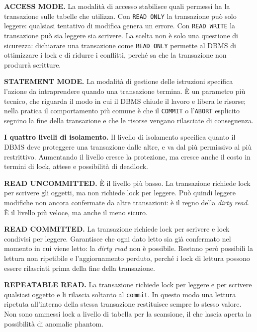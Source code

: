 \documentclass[12pt]{extarticle}
\begin{document}
\medskip
\noindent \textbf{ACCESS MODE.} La modalità di accesso stabilisce quali permessi ha la transazione sulle tabelle che utilizza. Con \texttt{READ ONLY} la transazione può solo leggere: qualsiasi tentativo di modifica genera un errore. Con \texttt{READ WRITE} la transazione può sia leggere sia scrivere. La scelta non è solo una questione di sicurezza: dichiarare una transazione come \texttt{READ ONLY} permette al DBMS di ottimizzare i lock e di ridurre i conflitti, perché sa che la transazione non produrrà scritture.

\medskip
\noindent \textbf{STATEMENT MODE.} La modalità di gestione delle istruzioni specifica l'azione da intraprendere quando una transazione termina. È un parametro più tecnico, che riguarda il modo in cui il DBMS chiude il lavoro e libera le risorse; nella pratica il comportamento più comune è che il \texttt{COMMIT} o l'\texttt{ABORT} esplicito segnino la fine della transazione e che le risorse vengano rilasciate di conseguenza.

\medskip
\noindent \textbf{I quattro livelli di isolamento.} Il livello di isolamento specifica quanto il DBMS deve proteggere una transazione dalle altre, e va dal più permissivo al più restrittivo. Aumentando il livello cresce la protezione, ma cresce anche il costo in termini di lock, attese e possibilità di deadlock.

\medskip
\noindent \textbf{READ UNCOMMITTED.} È il livello più basso. La transazione richiede lock per scrivere gli oggetti, ma non richiede lock per leggere. Può quindi leggere modifiche non ancora confermate da altre transazioni: è il regno della \textit{dirty read}. È il livello più veloce, ma anche il meno sicuro.

\medskip
\noindent \textbf{READ COMMITTED.} La transazione richiede lock per scrivere e lock condivisi per leggere. Garantisce che ogni dato letto sia già confermato nel momento in cui viene letto: la \textit{dirty read} non è possibile. Restano però possibili la lettura non ripetibile e l'aggiornamento perduto, perché i lock di lettura possono essere rilasciati prima della fine della transazione.

\medskip
\noindent \textbf{REPEATABLE READ.} La transazione richiede lock per leggere e per scrivere qualsiasi oggetto e li rilascia soltanto al \texttt{commit}. In questo modo una lettura ripetuta all'interno della stessa transazione restituisce sempre lo stesso valore. Non sono ammessi lock a livello di tabella per la scansione, il che lascia aperta la possibilità di anomalie phantom.
\end{document}
